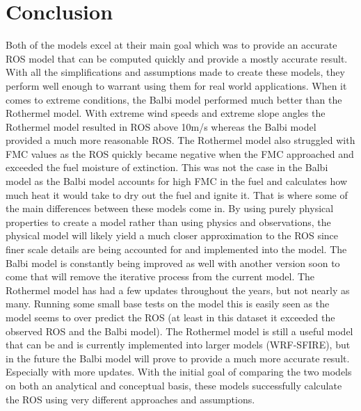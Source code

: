 \documentclass{article}
\begin{document}
\section{Conclusion}
\indent Both of the models excel at their main goal which was to provide an accurate ROS model that can be computed quickly and provide a mostly accurate result. With all the simplifications and assumptions made to create these models, they perform well enough to warrant using them for real world applications. When it comes to extreme conditions, the Balbi model performed much better than the Rothermel model. With extreme wind speeds and extreme slope angles the Rothermel model resulted in ROS above 10m/s whereas the Balbi model provided a much more reasonable ROS. The Rothermel model also struggled with FMC values as the ROS quickly became negative when the FMC approached and exceeded the fuel moisture of extinction. This was not the case in the Balbi model as the Balbi model accounts for high FMC in the fuel and calculates how much heat it would take to dry out the fuel and ignite it. That is where some of the main differences between these models come in. By using purely physical properties to create a model rather than using physics and observations, the physical model will likely yield a much closer approximation to the ROS since finer scale details are being accounted for and implemented into the model. The Balbi model is constantly being improved as well with another version soon to come that will remove the iterative process from the current model. The Rothermel model has had a few updates throughout the years, but not nearly as many. Running some small base tests on the model this is easily seen as the model seems to over predict the ROS (at least in this dataset it exceeded the observed ROS and the Balbi model). The Rothermel model is still a useful model that can be and is currently implemented into larger models (WRF-SFIRE), but in the future the Balbi model will prove to provide a much more accurate result. Especially with more updates. With the initial goal of comparing the two models on both an analytical and conceptual basis, these models successfully calculate the ROS using very different approaches and assumptions. 





%
%
%
\end{document}
